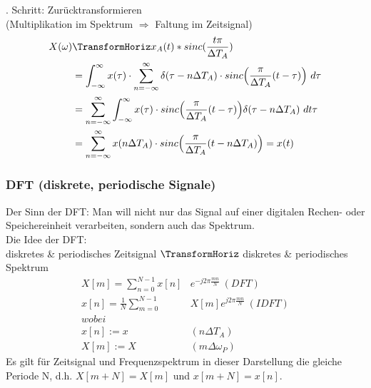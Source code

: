 \documentclass[12pt,a4paper]{scrartcl}
\begin{document}
  . Schritt: Zurücktransformieren\\
  (Multiplikation im Spektrum $\Rightarrow$ Faltung im Zeitsignal)
  \begin{equation}
    \label{eq:17}
    \begin{split}
      X(\omega) &\TransformHoriz x_A(t) * sinc(\frac{t\pi}{\Delta T_A}) \\
        &= \int_{-\infty}^{\infty}x(\tau) \cdot \sum_{n=-\infty}^{\infty} \delta(\tau - n\Delta T_A) \cdot sinc\Big(\frac{\pi}{\Delta T_A}(t-\tau)\Big)\ d\tau \\
         &= \sum_{n=-\infty}^{\infty} \int_{-\infty}^{\infty}x(\tau) \cdot sinc\Big(\frac{\pi}{\Delta T_A}(t-\tau)\Big) \delta(\tau - n\Delta T_A)\ dt \tau \\
         &= \sum_{n=-\infty}^{\infty} x(n \Delta T_A) \cdot sinc\Big(\frac{\pi}{\Delta T_A}(t-n\Delta T_A)\Big) = x(t) 
        \end{split}
  \end{equation} 


  \subsubsection{DFT (diskrete, periodische Signale)}
  \label{sec.sub:sub:dft}

\noindent Der Sinn der DFT: Man will nicht nur das Signal auf einer digitalen Rechen- oder Speichereinheit verarbeiten, sondern auch das Spektrum. \\
  Die Idee der DFT: \\
    diskretes \& periodisches Zeitsignal $\TransformHoriz$ diskretes \& periodisches Spektrum \\
\begin{equation}
  \label{eq:18}
  \begin{split}
    X[m] = \sum_{n = 0}^{N-1} x[n]& e^{-j2\pi \frac{mn}{N}}\ (DFT) \\
    x[n] = \frac{1}{N}\sum_{m = 0}^{N-1} &X[m] e^{j2\pi \frac{mn}{N}}\ (IDFT) \\
    wobei& \\
    x[n] := x&(n\Delta T_A) \\
    X[m] := X&(m\Delta \omega_P)
  \end{split}
\end{equation}
\noindent Es gilt für Zeitsignal und Frequenzspektrum in dieser Darstellung die gleiche Periode N, d.h. $X[m+N] = X[m]$ und $x[m +N] = x[n]$. \\
\end{document}
